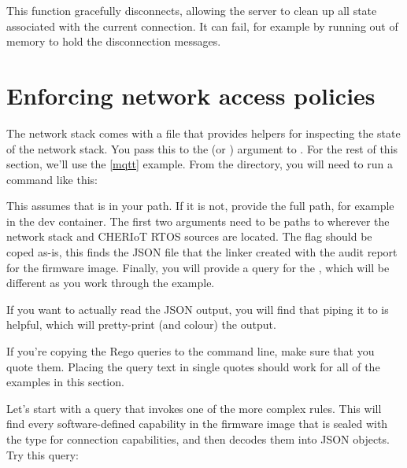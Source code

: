 This function gracefully disconnects, allowing the server to clean up all state associated with the current connection.
It can fail, for example by running out of memory to hold the disconnection messages.


\section{Enforcing network access policies}

The network stack comes with a  file that provides helpers for inspecting the state of the network stack.
You pass this to the  (or ) argument to .
For the rest of this section, we'll use  the \ref{mqtt} example.
From the  directory, you will need to run a command like this:

\begin{console}
$ cheriot-audit -m path/to/network-stack/network_stack.rego \\
	-b path/to/sdk/boards/sonata.json \\
	-j build/cheriot/cheriot/release/mqtt.json \\
	-q {query\}
\end{console}

This assumes that  is in your path.
If it is not, provide the full path, for example  in the dev container.
The first two arguments need to be paths to wherever the network stack and CHERIoT RTOS sources are located.
The  flag should be coped as-is, this finds the JSON file that the linker created with the audit report for the firmware image.
Finally, you will provide a query for the , which will be different as you work through the example.

If you want to actually read the JSON output, you will find that piping it to  is helpful, which will pretty-print (and colour) the output.

\begin{note}
If you're copying the Rego queries to the command line, make sure that you quote them.
Placing the query text in single quotes should work for all of the examples in this section.
\end{note}

Let's start with a query that invokes one of the more complex rules.
This will find every software-defined capability in the firmware image that is sealed with the type for connection capabilities, and then decodes them into JSON objects.
Try this query:

